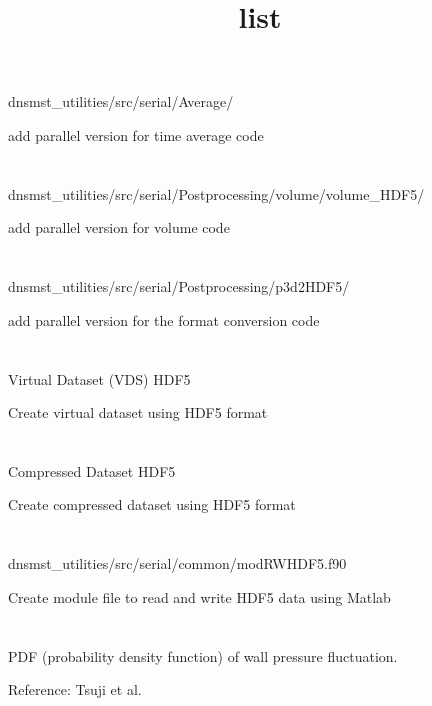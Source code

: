 \documentclass[12pt, oneside]{article}
\title{list}
\author{}
\begin{document}
\maketitle

\section{} 
dnsmst\_utilities/src/serial/Average/

add parallel version for time average code

\section{}
dnsmst\_utilities/src/serial/Postprocessing/volume/volume\_HDF5/

add parallel version for volume code

\section{}
dnsmst\_utilities/src/serial/Postprocessing/p3d2HDF5/

add parallel version for the format conversion code

\section{}
Virtual Dataset (VDS) HDF5

Create virtual dataset using HDF5 format

\section{}
Compressed Dataset HDF5

Create compressed dataset using HDF5 format

\section{}
dnsmst\_utilities/src/serial/common/modRWHDF5.f90

Create module file to read and write HDF5 data using Matlab

\section{}
PDF (probability density function) of wall pressure fluctuation.

Reference: Tsuji et al.~\cite{tsuji2007pressure}
\end{document}
